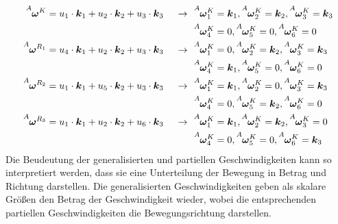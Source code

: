 \begin{align}
\vel{A}{\omega}{K} &= u\idx1 \cdot \bs{k}\idx1 + u\idx2 \cdot \bs{k}\idx2 + u\idx3 \cdot \bs{k}\idx3 &\rArrow &\vel{A}{\omega}{K}\idx1 = \bs{k}\idx1, \vel{A}{\omega}{K}\idx2 = \bs{k}\idx2, \vel{A}{\omega}{K}\idx3 = \bs{k}\idx3 \\
& & &\vel{A}{\omega}{K}\idx4 = 0, \vel{A}{\omega}{K}\idx5 = 0, \vel{A}{\omega}{K}\idx6 = 0 \nonumber
\\
\vel{A}{\omega}{R\idx1} &= u\idx4 \cdot \bs{k}\idx1 + u\idx2 \cdot \bs{k}\idx2 + u\idx3 \cdot \bs{k}\idx3 &\rArrow 
&\vel{A}{\omega}{K}\idx1 = 0, \vel{A}{\omega}{K}\idx2 = \bs{k}\idx2, \vel{A}{\omega}{K}\idx3 = \bs{k}\idx3 \\
& & &\vel{A}{\omega}{K}\idx4 = \bs{k}\idx1, \vel{A}{\omega}{K}\idx5 = 0, \vel{A}{\omega}{K}\idx6 = 0 \nonumber
\\
\vel{A}{\omega}{R\idx2} &= u\idx1 \cdot \bs{k}\idx1 + u\idx5 \cdot \bs{k}\idx2 + u\idx3 \cdot \bs{k}\idx3&\rArrow 
&\vel{A}{\omega}{K}\idx1 = \bs{k}\idx1, \vel{A}{\omega}{K}\idx2 = 0, \vel{A}{\omega}{K}\idx3 = \bs{k}\idx3 \\
& & &\vel{A}{\omega}{K}\idx4 = 0, \vel{A}{\omega}{K}\idx5 = \bs{k}\idx2, \vel{A}{\omega}{K}\idx6 = 0 \nonumber
\\
\vel{A}{\omega}{R\idx3} &= u\idx1 \cdot \bs{k}\idx1 + u\idx2 \cdot \bs{k}\idx2 + u\idx6 \cdot \bs{k}\idx3&\rArrow 
&\vel{A}{\omega}{K}\idx1 = \bs{k}\idx1, \vel{A}{\omega}{K}\idx2 = \bs{k}\idx2, \vel{A}{\omega}{K}\idx3 = 0 \\
& & &\vel{A}{\omega}{K}\idx4 = 0, \vel{A}{\omega}{K}\idx5 = 0, \vel{A}{\omega}{K}\idx6 = \bs{k}\idx3 \nonumber \,
\end{align}
Die Beudeutung der generalisierten und partiellen Geschwindigkeiten kann so interpretiert werden, dass sie eine Unterteilung der Bewegung in Betrag und Richtung darstellen. Die generalisierten Geschwindigkeiten geben als skalare Größen den Betrag der Geschwindigkeit wieder, wobei die entsprechenden partiellen Geschwindigkeiten die Bewegungsrichtung darstellen.

